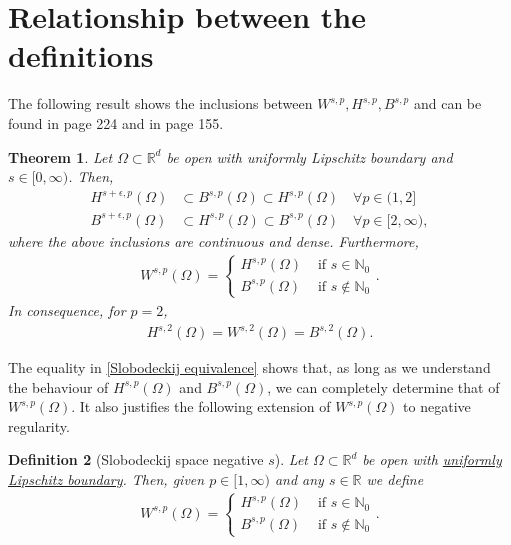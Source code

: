 \documentclass[
    a4paper,
    DIV=14,
    abstract=true,
    numbers=noenddot
]
{scrartcl}
\newtheorem{theorem}{Theorem}[section]
\newtheorem{definition}[theorem]{Definition}
\theoremstyle{definition}
\newcommand{\N}{\mathbb{N}}
\newcommand{\R}{\mathbb{R}}
\begin{document}
\section{Relationship between the definitions}
The following result shows the inclusions between $W^{s,p},H^{s,p},B^{s,p}$ and can be found in \cite{agranovich2015sobolev} page 224 and in \cite{stein1970singular} page 155.
\begin{theorem}\label{equivalence fractional spaces}
  Let $\Omega \subset \R^d$ be open with uniformly Lipschitz boundary and $s \in [0,\infty)$. Then,
  \begin{align*}
    H^{s+\epsilon,p}(\Omega ) & \subset B^{s,p}(\Omega )  \subset H^{s,p}(\Omega )\quad \forall p \in (1,2]       \\
    B^{s+\epsilon,p}(\Omega ) & \subset H^{s,p}(\Omega )  \subset B^{s,p}(\Omega )\quad \forall p \in [2,\infty),
  \end{align*}
  where the above inclusions are continuous and dense. Furthermore,
  \begin{align}\label{Slobodeckij equivalence}
    W^{s,p}(\Omega )= \begin{cases}
                        H^{s,p}(\Omega ) & \text{ if } s \in \N_0    \\
                        B^{s,p}(\Omega ) & \text{ if } s \notin \N_0
                      \end{cases}.
  \end{align}
  In consequence, for $p=2$,
  \begin{align}\label{p=2}
    H^{s,2}(\Omega )=W^{s,2}(\Omega )=B^{s,2}(\Omega ).
  \end{align}
\end{theorem}
The equality in \eqref{Slobodeckij equivalence} shows that, as long as we understand the behaviour of $H^{s,p}(\Omega )$ and $B^{s,p}(\Omega )$, we can completely determine that of $W^{s,p}(\Omega )$. It also justifies the following extension of $W^{s,p}(\Omega )$ to negative regularity.
\begin{definition}[Slobodeckij space negative $s$]\label{negative s Slobodeckij}
  Let $\Omega \subset \R^d$ be open with \href{https://nowheredifferentiable.com/2023-07-12-PDEs-3-Sobolev_spaces/#:~:text=has-,uniformly%20Lipschitz%20boundary,-if%20there%20exists}{uniformly Lipschitz boundary}. Then, given $p \in [1,\infty)$ and any  $s \in \R$ we define
  \begin{align*}
    W^{s,p}(\Omega )= \begin{cases}
                        H^{s,p}(\Omega ) & \text{ if } s \in \N_0    \\
                        B^{s,p}(\Omega ) & \text{ if } s \notin \N_0
                      \end{cases}.
  \end{align*}
\end{definition}
\end{document}
